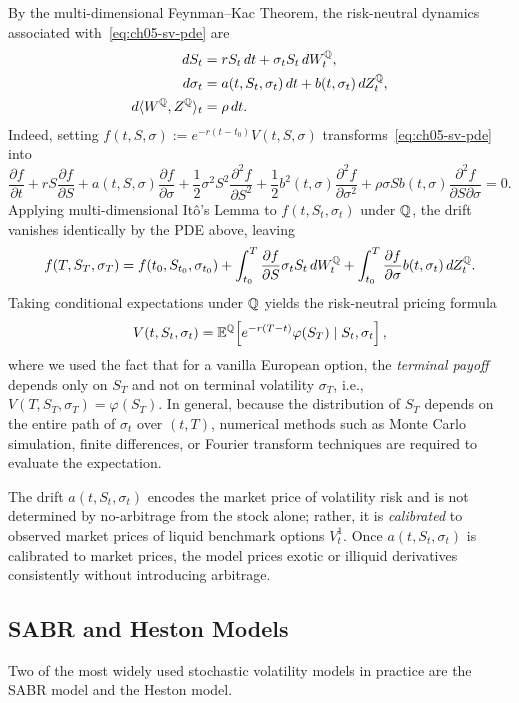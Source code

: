By the multi-dimensional Feynman--Kac Theorem, the risk-neutral dynamics associated with~\eqref{eq:ch05-sv-pde} are
\begin{align*}
    dS_t &= r S_t\,dt + \sigma_t S_t\,dW_t^{\mathbb{Q}}, \\
    d\sigma_t &= a(t, S_t, \sigma_t)\,dt + b(t, \sigma_t)\,dZ_t^{\mathbb{Q}}, \\
    d\langle W^{\mathbb{Q}}, Z^{\mathbb{Q}} \rangle_t &= \rho\,dt.
\end{align*}
Indeed, setting $f(t, S, \sigma) := e^{-r(t - t_0)} V(t, S, \sigma)$ transforms~\eqref{eq:ch05-sv-pde} into
\[
    \frac{\partial f}{\partial t} + r S \frac{\partial f}{\partial S} + a(t, S, \sigma)\frac{\partial f}{\partial \sigma}
    + \frac{1}{2}\sigma^2 S^2 \frac{\partial^2 f}{\partial S^2} + \frac{1}{2}b^2(t, \sigma)\frac{\partial^2 f}{\partial \sigma^2} + \rho\sigma S b(t, \sigma)\frac{\partial^2 f}{\partial S \partial \sigma} = 0.
\]
Applying multi-dimensional It\^o's Lemma to $f(t, S_t, \sigma_t)$ under $\mathbb{Q}$, the drift vanishes identically by the PDE above, leaving
\[
    f(T, S_T, \sigma_T) = f(t_0, S_{t_0}, \sigma_{t_0})
    + \int_{t_0}^T \frac{\partial f}{\partial S}\sigma_t S_t\,dW_t^{\mathbb{Q}}
    + \int_{t_0}^T \frac{\partial f}{\partial \sigma}b(t, \sigma_t)\,dZ_t^{\mathbb{Q}}.
\]
Taking conditional expectations under $\mathbb{Q}$ yields the risk-neutral pricing formula
\[
    V(t, S_t, \sigma_t) = \mathbb{E}^{\mathbb{Q}}\!\left[e^{-r(T-t)}\varphi(S_T) \mid S_t, \sigma_t\right],
\]
where we used the fact that for a vanilla European option, the \emph{terminal payoff} depends only on $S_T$ and not on terminal volatility $\sigma_T$, i.e., $V(T, S_T, \sigma_T) = \varphi(S_T)$. In general, because the distribution of $S_T$ depends on the entire path of $\sigma_t$ over $(t, T)$, numerical methods such as Monte Carlo simulation, finite differences, or Fourier transform techniques are required to evaluate the expectation.

\begin{note}
    The drift $a(t, S_t, \sigma_t)$ encodes the market price of volatility risk and is not determined by no-arbitrage from the stock alone; rather, it is \emph{calibrated} to observed market prices of liquid benchmark options $V_t^1$. Once $a(t, S_t, \sigma_t)$ is calibrated to market prices, the model prices exotic or illiquid derivatives consistently without introducing arbitrage.
\end{note}

\subsection{SABR and Heston Models}
Two of the most widely used stochastic volatility models in practice are the SABR model and the Heston model.


